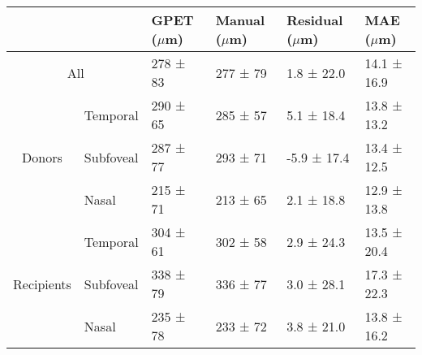 \begin{tabular}{clllll}
\toprule
\multicolumn{2}{l}{} & GPET ($\mu$m) & Manual ($\mu$m) & Residual ($\mu$m) & MAE ($\mu$m) \\
\midrule
\multicolumn{2}{c}{All} & 278 ± 83 & 277 ± 79 & 1.8 ± 22.0 & 14.1 ± 16.9 \\
\multirow{3}{*}{Donors} & Temporal & 290 ± 65 & 285 ± 57 & 5.1 ± 18.4 & 13.8 ± 13.2 \\
 & Subfoveal & 287 ± 77 & 293 ± 71 & -5.9 ± 17.4 & 13.4 ± 12.5 \\
 & Nasal & 215 ± 71 & 213 ± 65 & 2.1 ± 18.8 & 12.9 ± 13.8 \\
\multirow{3}{*}{Recipients} & Temporal & 304 ± 61 & 302 ± 58 & 2.9 ± 24.3 & 13.5 ± 20.4 \\
 & Subfoveal & 338 ± 79 & 336 ± 77 & 3.0 ± 28.1 & 17.3 ± 22.3 \\
 & Nasal & 235 ± 78 & 233 ± 72 & 3.8 ± 21.0 & 13.8 ± 16.2 \\
 \bottomrule
\end{tabular}
